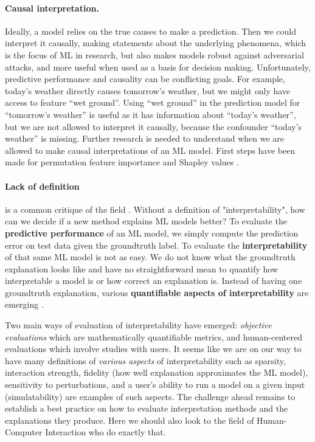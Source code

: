 \documentclass[runningheads]{llncs}
\begin{document}
\paragraph{Causal interpretation.}
Ideally, a model relies on the true causes to make a prediction.
Then we could  interpret it causally, making statements about the underlying phenomena, which is the focus of ML in research, but also makes models robust against adversarial attacks, and more useful when used as a basis for decision making.
Unfortunately, predictive performance and causality can be conflicting goals.
For example, today's weather directly causes tomorrow's weather, but we might only have access to feature \enquote{wet ground}.
Using \enquote{wet ground} in the prediction model for \enquote{tomorrow's weather} is useful as it has information about \enquote{today's weather}, but we are not allowed to interpret it causally, because the confounder \enquote{today's weather} is missing.
Further research is needed to understand when we are allowed to make causal interpretations of an ML model.
First steps have been made for permutation feature importance \cite{konig2020relative} and Shapley values \cite{ma2020predictive}.

\paragraph{Lack of definition} is a common critique of the field \cite{lipton2018mythos,doshi2017towards}.
Without a definition of "interpretability", how can we decide if a new method explains ML models better?
To evaluate the \textbf{predictive performance} of an ML model, we simply compute the prediction error on test data given the groundtruth label.
To evaluate the \textbf{interpretability} of that same ML model is not as easy.
We do not know what the groundtruth explanation looks like and have no straightforward mean to quantify how interpretable a model is or how correct an explanation is.
Instead of having one groundtruth explanation, various \textbf{quantifiable aspects of interpretability} are emerging \cite{poursabzi2018manipulating,philipp2018measuring,molnar2019quantifying,hauenstein2018computing,zhou2018measuring,akaike1998information,schwarz1978estimating,poursabzi2018manipulating,dhurandhar2017tip,friedler2019assessing}.

Two main ways of evaluation of interpretability have emerged: \textit{objective evaluations} which are mathematically quantifiable metrics, and {human-centered evaluations} which involve studies with users.
It seems like we are on our way to have many definitions of \textit{various aspects} of interpretability such as sparsity, interaction strength, fidelity (how well explanation approximates the ML model), sensitivity to perturbations,  and a user's ability to run a model on a given input (simulatability) are examples of such aspects.
The challenge ahead remains to establish a best practice on how to evaluate interpretation methods and the explanations they produce.
Here we should also look to the field of Human-Computer Interaction who do exactly that.
\end{document}
